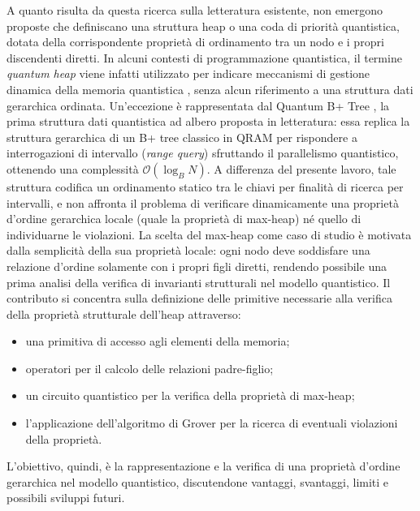 A quanto risulta da questa ricerca sulla letteratura esistente, non emergono proposte che definiscano una struttura heap o una coda di priorità quantistica, dotata della corrispondente proprietà di ordinamento tra un nodo e i propri discendenti diretti. In alcuni contesti di programmazione quantistica, il termine \emph{quantum heap} viene infatti utilizzato per indicare meccanismi di gestione dinamica della memoria quantistica \cite{su2024biquantumheaps, svore2018qsharp}, senza alcun riferimento a una struttura dati gerarchica ordinata. Un'eccezione è rappresentata dal Quantum B+ Tree \cite{liu2024treelikequantumdatastructure}, la prima struttura dati quantistica ad albero proposta in letteratura: essa replica la struttura gerarchica di un B+ tree classico in QRAM per rispondere a interrogazioni di intervallo (\emph{range query}) sfruttando il parallelismo quantistico, ottenendo una complessità $\mathcal{O}(\log_B N)$. A differenza del presente lavoro, tale struttura codifica un ordinamento statico tra le chiavi per finalità di ricerca per intervalli, e non affronta il problema di verificare dinamicamente una proprietà d'ordine gerarchica locale (quale la proprietà di max-heap) né quello di individuarne le violazioni. La scelta del max-heap come caso di studio è motivata dalla semplicità della sua proprietà locale: ogni nodo deve soddisfare una relazione d'ordine solamente con i propri figli diretti, rendendo possibile una prima analisi della verifica di invarianti strutturali nel modello quantistico. Il contributo si concentra sulla definizione delle primitive necessarie alla verifica della proprietà strutturale dell'heap attraverso:
\begin{itemize}
  \item una primitiva di accesso agli elementi della memoria;
  \item operatori per il calcolo delle relazioni padre-figlio;
  \item un circuito quantistico per la verifica della proprietà di max-heap;
  \item l'applicazione dell'algoritmo di Grover per la ricerca di eventuali
        violazioni della proprietà.
\end{itemize}
L'obiettivo, quindi, è la rappresentazione e la verifica di una proprietà d'ordine gerarchica nel modello quantistico, discutendone vantaggi, svantaggi, limiti e possibili sviluppi futuri.

